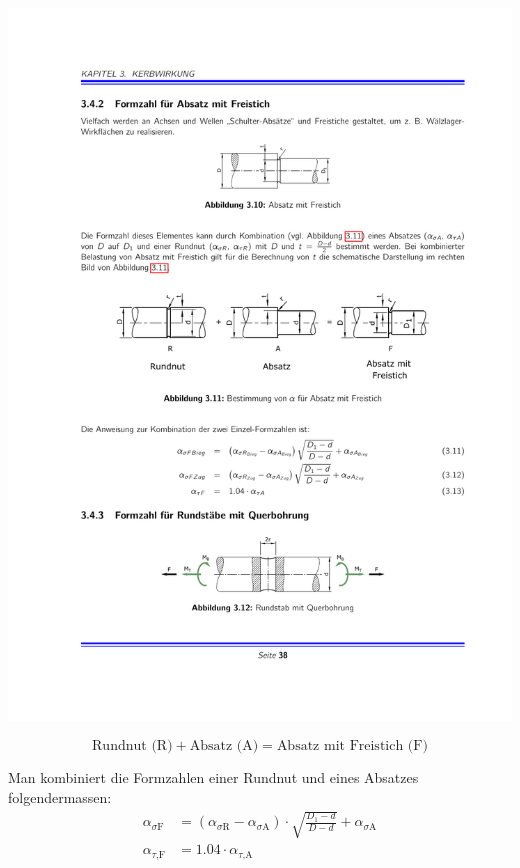 \begin{center}
			\includegraphics{graphics/freistich_kerbe_2}
		\end{center}
		\begin{equation*}
			\text{Rundnut (R)} + \text{Absatz (A)} = \text{Absatz mit Freistich (F)}
		\end{equation*}
		
		Man kombiniert die Formzahlen einer Rundnut und eines Absatzes folgendermassen:
		\begin{align*}
			\alpha_{\sigma\text{F}} &= (\alpha_{\sigma\text{R}}-\alpha_{\sigma\text{A}}) \cdot \sqrt{\frac{D_1-d}{D-d}} + \alpha_{\sigma\text{A}} \\
			\alpha_{\tau\text{,F}} &= 1.04 \cdot \alpha_{\tau\text{,A}}
		\end{align*}
